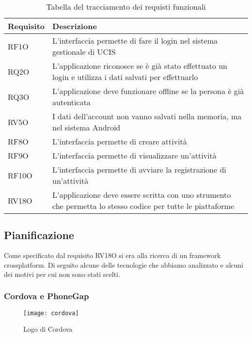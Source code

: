 \renewcommand{\arraystretch}{2}
\begin{longtable}{|p{4cm}|p{10cm}|}%
  \caption{Tabella del tracciamento dei requisti funzionali} 
  \label{tab:requisiti} \\
  
    \hline
    \textbf{Requisito} & \textbf{Descrizione} \\
    \hline
    \endhead
    RF1O     & L'interfaccia permette di fare il login nel sistema gestionale di UCIS \\ \hline
    RQ2O     & L'applicazione riconosce se è già stato effettuato un login e utilizza i dati salvati per effettuarlo \\ \hline
    RQ3O     & L'applicazione deve funzionare offline se la persona è già autenticata \\ \hline
    RV5O     & I dati dell'account non vanno salvati nella memoria, ma nel sistema Android \\ \hline
    RF8O     & L'interfaccia permette di creare attività \\ \hline
    RF9O     & L'interfaccia permette di visualizzare un'attività \\ \hline
    RF10O     & L'interfaccia permette di avviare la registrazione di un'attività \\ \hline
    RV18O     & L'applicazione deve essere scritta con uno strumento che permetta lo stesso codice per tutte le piattaforme \\ \hline
\end{longtable}%

\subsection{Pianificazione}

Come specificato dal requisito RV18O si era alla ricerca di un framework crossplatform. Di seguito alcune delle tecnologie che abbiamo analizzato e alcuni dei motivi per
cui non sono stati scelti.

\subsubsection{Cordova e PhoneGap}

\begin{figure}[h]
	\begin{center}
		\texttt{[image: cordova]}
		\caption{Logo di Cordova}
	\end{center}
\end{figure}

